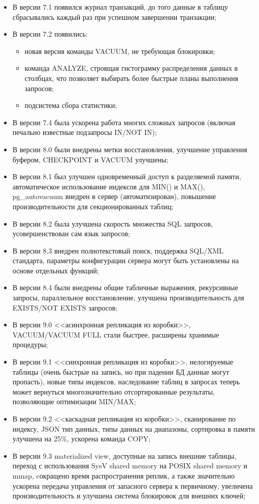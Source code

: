 \begin{itemize}
  \item В версии 7.1 появился журнал транзакций, до того данные в таблицу сбрасывались каждый раз при успешном завершении транзакции;
  \item В версии 7.2 появились:
  \begin{itemize}
    \item новая версия команды VACUUM, не требующая блокировки;
    \item команда ANALYZE, строящая гистограмму распределения данных в столбцах, что позволяет выбирать более быстрые планы выполнения запросов;
    \item подсистема сбора статистики;
  \end{itemize}
  \item В версии 7.4 была ускорена работа многих сложных запросов (включая печально известные подзапросы IN/NOT IN);
  \item В версии 8.0 были внедрены метки восстановления, улучшение управления буфером, CHECKPOINT и VACUUM улучшены;
  \item В версии 8.1 был улучшен одновременный доступ к разделяемой памяти, автоматическое использование индексов для MIN() и MAX(), pg\_autovacuum внедрен в сервер (автоматизирован), повышение производительности для секционированных таблиц;
  \item В версии 8.2 была улучшена скорость множества SQL запросов, усовершенствован сам язык запросов;
  \item В версии 8.3 внедрен полнотекстовый поиск, поддержка SQL/XML стандарта, параметры конфигурации сервера могут быть установлены на основе отдельных функций;
  \item В версии 8.4 были внедрены общие табличные выражения, рекурсивные запросы, параллельное восстановление, улучшена производительность для EXISTS/NOT EXISTS запросов;
  \item В версии 9.0 <<асинхронная репликация из коробки>>, VACUUM/VACUUM FULL стали быстрее, расширены хранимые процедуры;
  \item В версии 9.1 <<синхронная репликация из коробки>>, нелогируемые таблицы (очень быстрые на запись, но при падении БД данные могут пропасть), новые типы индексов, наследование таблиц в запросах теперь может вернуться многозначительно отсортированные результаты, позволяющие оптимизации MIN/MAX;
  \item В версии 9.2 <<каскадная репликация из коробки>>, сканирование по индексу, JSON тип данных, типы данных на диапазоны, сортировка в памяти улучшена на 25\%, ускорена команда COPY;
  \item В версии 9.3 materialized view, доступные на запись внешние таблицы, переход с использования SysV shared memory на POSIX shared memory и mmap, cокращено время распространения реплик, а также значительно ускорена передача управления от запасного сервера к первичному, увеличена производительность и улучшена система блокировок для внешних ключей;
\end{itemize}

